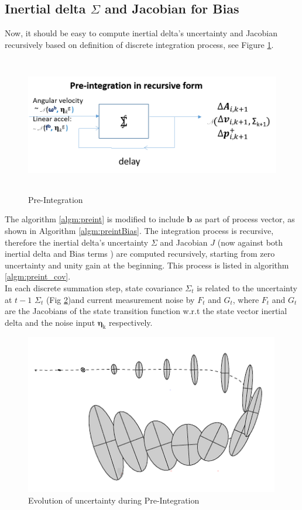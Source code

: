 \documentclass[12pt]{article}   %
\begin{document}
\subsection{Inertial delta $\Sigma$ and Jacobian for Bias}
Now, it should be easy to compute inertial delta's uncertainty and Jacobian recursively based on definition of discrete integration process, see Figure \ref{fig:preintBlock}.
\begin{figure}[h!]
	\label{fig:preint}
	\includegraphics[height=6cm]{figures/Pre-integration_block-flow.png}
	\caption{Pre-Integration}
	\label{fig:preintBlock}
\end{figure}

The algorithm \ref{algm:preint} is modified to include $\bm{b}$ as part of process vector, as shown in Algorithm \ref{algm:preintBias}. The integration process is recursive, therefore the inertial delta's uncertainty $\Sigma$ and Jacobian $J$ (now against both inertial delta and Bias terms ) are computed recursively, starting from zero uncertainty and unity gain at the beginning. This process is listed in algorithm \ref{algm:preint_cov}. \\
In each discrete summation step, state covariance $\Sigma_t$ is related to the uncertainty at $t-1$ $\Sigma_t$ (Fig \ref{fig:preintUncertainty})and current measurement noise by $F_t$ and $G_t$, where $F_t$ and $G_t$ are the Jacobians of the state transition function w.r.t the state vector inertial delta and the noise input $\mathrm{\bm{\eta}_k}$ respectively.
\begin{figure}[h!]
	\label{fig:preintUncertainty}
	\includegraphics[height=7cm]{figures/Inertial-delta_covariance_evolution.png}
	\caption{Evolution of uncertainty during Pre-Integration}
\end{figure}
\end{document}
